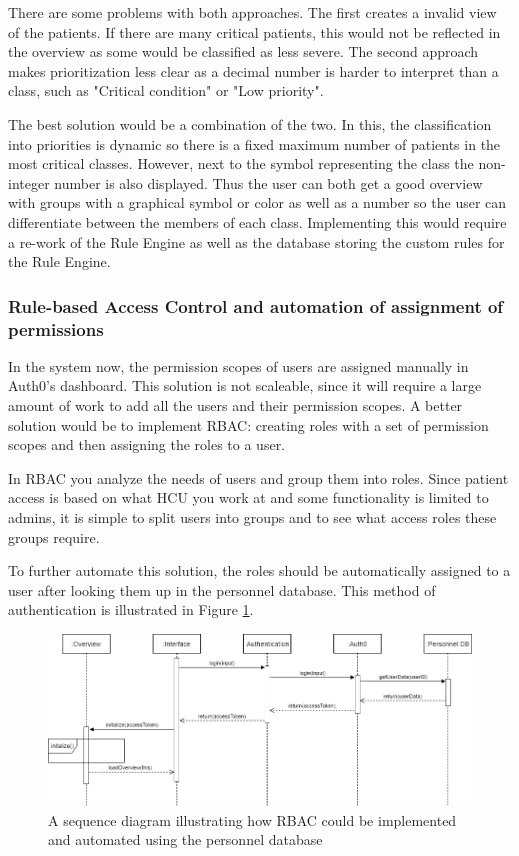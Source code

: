 \documentclass{article}
\begin{document}
There are some problems with both approaches. The first creates a invalid view of the patients. If there are many critical patients, this would not be reflected in the overview as some would be classified as less severe. The second approach makes prioritization less clear as a decimal number is harder to interpret than a class, such as "Critical condition" or "Low priority".

The best solution would be a combination of the two. In this, the classification into priorities is dynamic so there is a fixed maximum number of patients in the most critical classes. However, next to the symbol representing the class the non-integer number is also displayed. Thus the user can both get a good overview with groups with a graphical symbol or color as well as a number so the user can differentiate between the members of each class. Implementing this would require a re-work of the Rule Engine as well as the database storing the custom rules for the Rule Engine. 

\subsubsection{Rule-based Access Control and automation of assignment of permissions}\label{RBAC-future}
In the system now, the permission scopes of users are assigned manually in Auth0's dashboard. This solution is not scaleable, since it will require a large amount of work to add all the users and their permission scopes. A better solution would be to implement RBAC: creating roles with a set of permission scopes and then assigning the roles to a user.

In RBAC you analyze the needs of users and group them into roles. Since patient access is based on what HCU you work at and some functionality is limited to admins, it is simple to split users into groups and to see what access roles these groups require.

To further automate this solution, the roles should be automatically assigned to a user after looking them up in the personnel database. This method of authentication is illustrated in Figure \ref{fig:auth-sequence-advanced}.

\begin{figure}[h]
    \centering
    \includegraphics[scale = 0.45]{auth-sequence-advanced}
    \caption{A sequence diagram illustrating how RBAC could be implemented and automated using the personnel database}
    \label{fig:auth-sequence-advanced}
\end{figure}
\end{document}
